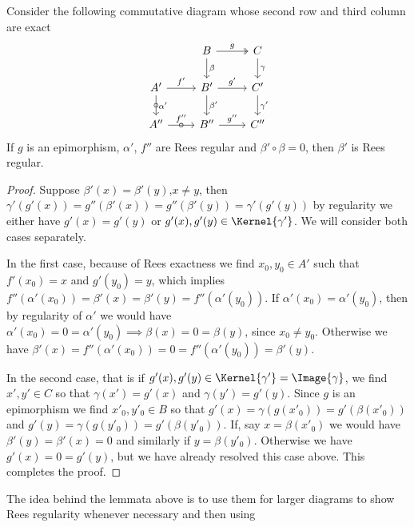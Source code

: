 \begin{lemma}\label{reglemma2}
    Consider the following commutative diagram whose second row and third column are exact
    \[\begin{tikzcd}
        & B & C \\
        {A'} & {B'} & {C'} \\
        {A''} & {B''} & {C''}
        \arrow["g", two heads, from=1-2, to=1-3]
        \arrow["\beta", from=1-2, to=2-2]
        \arrow["\gamma", from=1-3, to=2-3]
        \arrow["{f'}", from=2-1, to=2-2]
        \arrow["{\alpha'}", "\circ"{marking}, from=2-1, to=3-1]
        \arrow["{g'}", from=2-2, to=2-3]
        \arrow["{\beta'}", from=2-2, to=3-2]
        \arrow["{\gamma'}", from=2-3, to=3-3]
        \arrow["{f''}", "\circ"{marking}, from=3-1, to=3-2]
        \arrow["{g''}", from=3-2, to=3-3]
    \end{tikzcd}\]
    If $g$ is an epimorphism, $\alpha'$, $f''$ are Rees regular and $\beta'\circ\beta = 0$, then $\beta'$ is Rees regular.
\end{lemma}
\begin{proof}[Proof]
    Suppose $\beta'(x)=\beta'(y)$,$x\neq y$, then $\gamma'(g'(x))=g''(\beta'(x))=g''(\beta'(y)) = \gamma'(g'(y))$ by 
    regularity we either have $g'(x)=g'(y)$ or $g'(x),g'(y)\in\Kernel{\gamma'}$. We will consider both cases separately. \par 
    In the first case, because of Rees exactness 
    we find $x_0,y_0\in A'$ such that $f'(x_0)=x$ and $g'(y_0)=y$, which implies 
    $f''(\alpha'(x_0))=\beta'(x)=\beta'(y)=f''(\alpha'(y_0))$. If $\alpha'(x_0)=\alpha'(y_0)$, then by regularity 
    of $\alpha'$ we would have $\alpha'(x_0)=0=\alpha'(y_0) \implies \beta(x)=0=\beta(y)$, since $x_0\neq y_0$.
    Otherwise we have $\beta'(x)=f''(\alpha'(x_0))=0=f''(\alpha'(y_0))=\beta'(y)$.\par
    In the second case, that is if $g'(x),g'(y)\in\Kernel{\gamma'}=\Image{\gamma}$, we find $x',y'\in C$ so that 
    $\gamma(x')=g'(x)$ and $\gamma(y')=g'(y)$. Since $g$ is an epimorphism we find $x'_0,y'_0\in B$ so that 
    $g'(x) = \gamma(g(x'_0))= g'(\beta(x'_0))$ and $g'(y)=\gamma(g(y'_0))=g'(\beta(y'_0))$. If, say 
    $x = \beta(x'_0)$ we would have $\beta'(y)=\beta'(x)=0$ and similarly if $y=\beta(y'_0)$. Otherwise we have $g'(x)=0=g'(y)$, but we have already resolved this case above. This completes the proof.
\end{proof}
The idea behind the lemmata above is to use them for larger diagrams to show Rees regularity whenever necessary and then using
